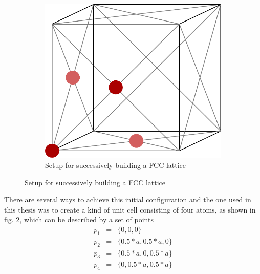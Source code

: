 \documentclass[12pt]{article}
\begin{document}
\begin{figure}[h]
\begin{center}
\begin{subfigure}[t]{0.4\textwidth}
            \includegraphics[scale=0.3]{images/unit_cell.pdf}
            \caption{Setup for successively building a FCC lattice}
            \label{fig:unitcell}
        \end{subfigure}
    \end{center}
\end{figure}
There are several ways to achieve this initial configuration and the one used in this thesis \cite{buffalo} was to create a kind of unit cell 
consisting of four atoms, as shown in fig. \ref{fig:unitcell}, which can be described by a set of points
\begin{eqnarray*}
    p_1 &=& \{0,0,0\}\\
    p_2 &=& \{0.5*a,0.5*a,0\}\\
    p_3 &=& \{0.5*a,0,0.5*a\}\\
    p_4 &=& \{0,0.5*a,0.5*a\}
\end{eqnarray*}
\end{document}
